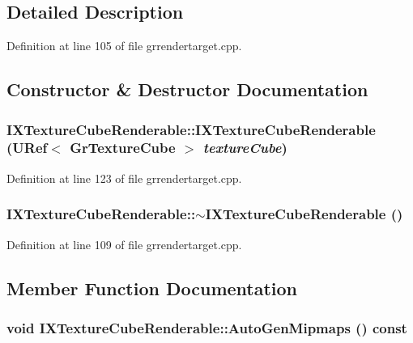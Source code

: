 \subsection{Detailed Description}


Definition at line 105 of file grrendertarget.cpp.

\subsection{Constructor \& Destructor Documentation}
\hypertarget{class_i_x_texture_cube_renderable_23c67995138458458f43e56a3b9d92f0}{
\subsubsection[{IXTextureCubeRenderable}]{\setlength{\rightskip}{0pt plus 5cm}IXTextureCubeRenderable::IXTextureCubeRenderable ({\bf URef}$<$ {\bf GrTextureCube} $>$ {\em textureCube})}}
\label{class_i_x_texture_cube_renderable_23c67995138458458f43e56a3b9d92f0}




Definition at line 123 of file grrendertarget.cpp.\hypertarget{class_i_x_texture_cube_renderable_fefc7f1900ff256075a1f1b040bd64e8}{
\subsubsection[{$\sim$IXTextureCubeRenderable}]{\setlength{\rightskip}{0pt plus 5cm}IXTextureCubeRenderable::$\sim$IXTextureCubeRenderable ()}}
\label{class_i_x_texture_cube_renderable_fefc7f1900ff256075a1f1b040bd64e8}




Definition at line 109 of file grrendertarget.cpp.

\subsection{Member Function Documentation}
\hypertarget{class_i_x_texture_cube_renderable_a3eac9a1a8de19d222ca98549a6f655f}{
\subsubsection[{AutoGenMipmaps}]{\setlength{\rightskip}{0pt plus 5cm}void IXTextureCubeRenderable::AutoGenMipmaps () const}}
\label{class_i_x_texture_cube_renderable_a3eac9a1a8de19d222ca98549a6f655f}




